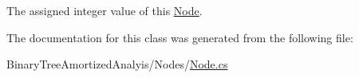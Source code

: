 The assigned integer value of this \hyperlink{class_binary_tree_amortized_analyis_1_1_node}{Node}. 



The documentation for this class was generated from the following file\+:\begin{DoxyCompactItemize}
\item 
Binary\+Tree\+Amortized\+Analyis/\+Nodes/\hyperlink{_node_8cs}{Node.\+cs}\end{DoxyCompactItemize}
